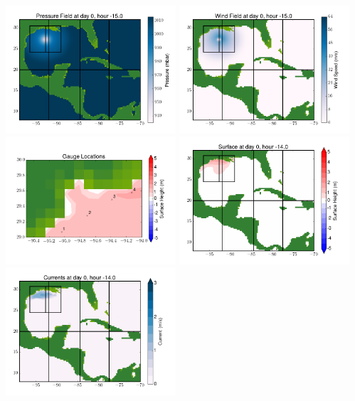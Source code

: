 \documentclass[11pt]{article}
\begin{document}
\includegraphics[width=0.475\textwidth]{frame0057fig8.png}
\vskip 10pt 
\includegraphics[width=0.475\textwidth]{frame0057fig9.png}
\includegraphics[width=0.475\textwidth]{frame0057fig10.png}
\vskip 10pt 
\includegraphics[width=0.475\textwidth]{frame0058fig1.png}
\includegraphics[width=0.475\textwidth]{frame0058fig2.png}
\end{document}
